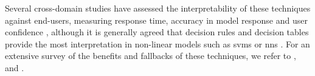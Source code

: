 Several cross-domain studies have assessed the interpretability of these techniques against end-users, measuring response time, accuracy in model response and user confidence \citep{Huysmans:2011gq,Hayete:2005tn,Allahyari:2011ud,Subramanian:1992ue,Schwabacher:2001wc,Freitas:2010vk,Martens:2011uh,Verbeke:2011vo}, although it is generally agreed that decision rules and decision tables provide the most interpretation in non-linear models such as \glspl{svm} or \glspl{nn} \citep{Freitas:2010vk,Martens:2011uh,Verbeke:2011vo}. For an extensive survey of the benefits and fallbacks of these techniques, we refer to \citet{Freitas:2014ic}, \citet{DoshiVelez:2017vm} and \citet{DoshiVelez:2017wu}.
